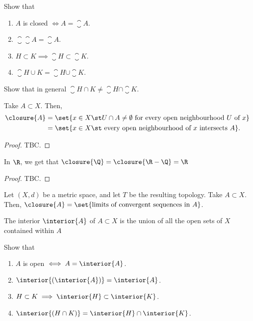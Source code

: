 \begin{exercise}
Show that
\begin{enumerate}
\item $A$ is closed $\iff A = \closure{A}$.
\item $\closure{\closure{A}} = \closure{A}$.
\item $H \subset K \implies \closure{H} \subset \closure{K}$.
\item $\closure{H \cup K} = \closure{H} \cup \closure{K}$.
\end{enumerate}
\end{exercise}

\begin{exercise}
  Show that in general $\closure{H \cap K} \neq \closure{H} \cap \closure{K}$.
\end{exercise}

\begin{nlemma}
  Take $A \subset X$. Then,
  \begin{align*}
    \closure{A} &= \set{x \in X \st U \cap A \neq \emptyset \text{ for every open neighbourhood } U \text{ of } x}\\
    &= \set{x \in X \st \text{ every open neighbourhood of } x \text{ intersects } A}.
  \end{align*}
\end{nlemma}
\begin{proof}
  TBC.
\end{proof}

\begin{ncor}
  In $\R$, we get that $\closure{\Q} = \closure{\R-\Q} = \R$
\end{ncor}
\begin{proof}
  TBC.
\end{proof}

\begin{nprop}
  Let $(X,d)$ be a metric space, and let $T$ be the resulting topology. Take $A \subset X$. Then, $\closure{A} = \set{\text{limits of convergent sequences in }A}$.
\end{nprop}

\begin{ndfn}[Interior]
  The interior $\interior{A}$ of $A \subset X$ is the union of all the open sets of $X$ contained within $A$
\end{ndfn}

\begin{exercise}
Show that
\begin{enumerate}
\item $A$ is open $\iff A = \interior{A}$.
\item $\interior{(\interior{A})} = \interior{A}$.
\item $H \subset K \implies \interior{H} \subset \interior{K}$.
\item $\interior{(H \cap K)} = \interior{H} \cap \interior{K}$.
\end{enumerate}
\end{exercise}

